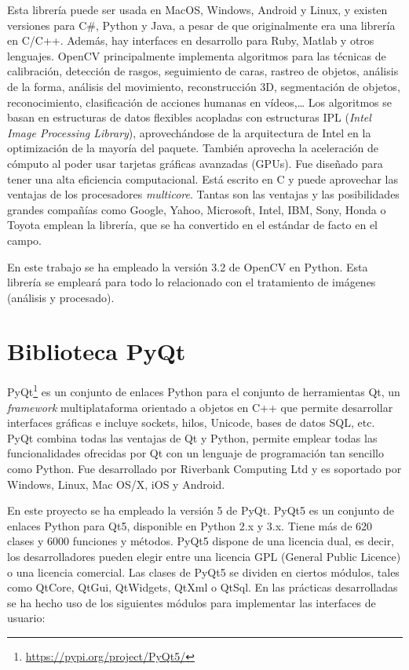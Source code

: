 Esta librería puede ser usada en MacOS, Windows, Android y Linux, y existen versiones para C\#, Python y Java, a pesar de que originalmente era una librería en C/C++. Además, hay interfaces en desarrollo para Ruby, Matlab y otros lenguajes.
OpenCV principalmente implementa algoritmos para las técnicas de calibración, detección de rasgos, seguimiento de caras, rastreo de objetos, análisis de la forma, análisis del movimiento, reconstrucción 3D, segmentación de objetos, reconocimiento, clasificación de acciones humanas en vídeos,…  Los algoritmos se basan en estructuras de datos flexibles acopladas con estructuras IPL (\textit{Intel Image Processing Library}), aprovechándose de la arquitectura de Intel en la optimización de la mayoría del paquete. También aprovecha la aceleración de cómputo al poder usar tarjetas gráficas avanzadas (GPUs). Fue diseñado para tener una alta eficiencia computacional. Está escrito en C y puede aprovechar las ventajas de los procesadores \textit{multicore}. Tantas son las ventajas y las posibilidades grandes compañías como Google, Yahoo, Microsoft, Intel, IBM, Sony, Honda o Toyota emplean la librería, que se ha convertido en el estándar de facto en el campo. 

En este trabajo se ha empleado la versión 3.2 de OpenCV en Python. Esta librería se empleará para todo lo relacionado con el tratamiento de imágenes (análisis y procesado). 

\section{Biblioteca PyQt}
PyQt\footnote{\url{https://pypi.org/project/PyQt5/}} es un conjunto de enlaces Python para el conjunto de herramientas Qt, un \textit{framework} multiplataforma orientado a objetos en C++  que permite desarrollar interfaces gráficas e incluye sockets, hilos, Unicode, bases de datos SQL, etc. PyQt combina todas las ventajas de Qt y Python, permite emplear todas las funcionalidades ofrecidas por Qt con un lenguaje de programación tan sencillo como Python. Fue desarrollado por Riverbank Computing Ltd y es soportado por Windows, Linux, Mac OS/X, iOS y Android.

En este proyecto se ha empleado la versión 5 de PyQt. PyQt5 es un conjunto de enlaces Python para Qt5, disponible en Python 2.x y 3.x. Tiene más de 620 clases y 6000 funciones y métodos. PyQt5 dispone de una licencia dual, es decir, los desarrolladores pueden elegir entre una licencia GPL (General Public Licence) o una licencia comercial. 
Las clases de PyQt5 se dividen en ciertos módulos, tales como QtCore, QtGui, QtWidgets, QtXml o QtSql. En las prácticas desarrolladas se ha hecho uso de los siguientes módulos para implementar las interfaces de usuario:

